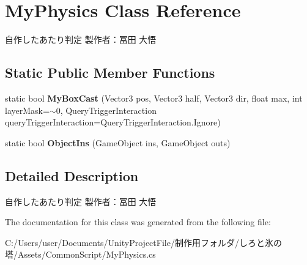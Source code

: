 \hypertarget{class_my_physics}{}\section{My\+Physics Class Reference}
\label{class_my_physics}


自作したあたり判定 製作者：冨田 大悟  


\subsection*{Static Public Member Functions}
\begin{DoxyCompactItemize}
\item 
\mbox{\label{class_my_physics_a418534ff3a78b1b5cc0dd160e060b20c}} 
static bool {\bfseries My\+Box\+Cast} (Vector3 pos, Vector3 half, Vector3 dir, float max, int layer\+Mask=$\sim$0, Query\+Trigger\+Interaction query\+Trigger\+Interaction=Query\+Trigger\+Interaction.\+Ignore)
\item 
\mbox{\label{class_my_physics_a75847cdde0a27ff03923818ea6f1e6c7}} 
static bool {\bfseries Object\+Ins} (Game\+Object ins, Game\+Object outs)
\end{DoxyCompactItemize}


\subsection{Detailed Description}
自作したあたり判定 製作者：冨田 大悟 



The documentation for this class was generated from the following file\+:\begin{DoxyCompactItemize}
\item 
C\+:/\+Users/user/\+Documents/\+Unity\+Project\+File/制作用フォルダ/しろと氷の塔/\+Assets/\+Common\+Script/My\+Physics.\+cs\end{DoxyCompactItemize}
